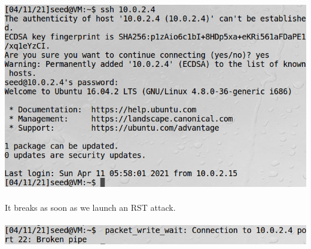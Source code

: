 \documentclass[a4paper]{article}
\begin{document}
\includegraphics[scale=0.7]{1/13.png}\\\\
It breaks as soon as we launch an RST attack.\\\\
\includegraphics[scale=0.7]{1/14.png}\\\\
\end{document}
